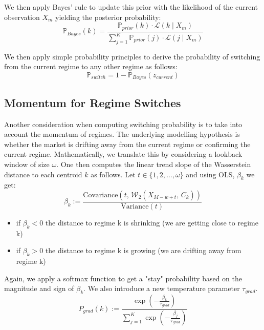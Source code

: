 \documentclass[12pt,a4paper]{report}
\begin{document}
We then apply Bayes' rule to update this prior with the likelihood of the current observation $X_m$ yielding the posterior probability: 
\begin{equation}
  \mathbb{P}_{Bayes}(k) = \frac{\mathbb{P}_{prior}(k) \cdot \mathcal{L}(k \mid X_m)}{\sum_{j=1}^{K} \mathbb{P}_{prior}(j) \cdot \mathcal{L}(j \mid X_m)}
\end{equation}

We then apply simple probability principles to derive the probability of switching from the current regime to any other regime as follows:
\begin{equation}
\mathbb{P}_{switch} = 1- \mathbb{P}_{Bayes}(z_{current})
\end{equation}

\subsection{ Momentum for Regime Switches}
Another consideration when computing switching probability is to take into account the momentum of regimes. 
The underlying modelling hypothesis is whether the market is drifting away from the current regime or confirming the current regime.
Mathematically, we translate this by considering a lookback window of size $\omega$. One then computes the linear trend slope of the Wasserstein distance to each centroid $k$ as follows. 
Let $t \in \{1,2, \dots, \omega \}$ and using  OLS, $\beta_{k}$ we get:
\begin{equation}
  \beta_k := \frac{\text{Covariance}(t, \, \mathcal{W}_2(X_{M-w+t}, \, C_k))}{\text{Variance}(t)} \label{eq:gradient_signal}
\end{equation}


\begin{itemize}
    \item if $\beta_{k} < 0$ the distance to regime k is shrinking (we are getting close to regime k)
    \item if $\beta_{k} > 0$ the distance to regime k is growing  (we are drifting away from regime k)
\end{itemize}

Again, we apply a softmax function to get a "stay" probability based on the magnitude and sign of $\beta_k$. We also introduce a new temperature parameter $\tau_{grad}$.
\begin{equation}
P_{grad}(k) := \frac{\exp\left(-\frac{\beta_k}{\tau_{grad}}\right)}{\sum_{j=1}^{K} \exp\left(-\frac{\beta_j}{\tau_{grad}}\right)} \label{eq:softmax_tau_grad}
\end{equation}
\end{document}
